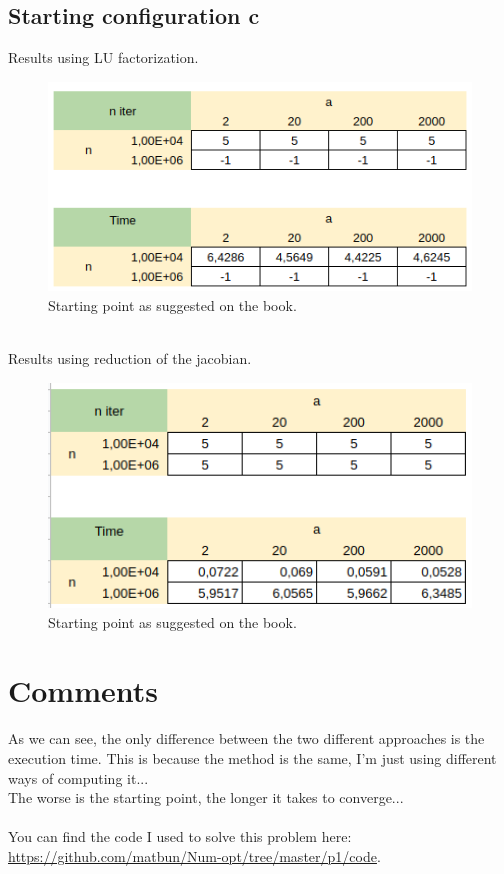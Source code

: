 \documentclass[]{article}
\begin{document}
\subsection{Starting configuration c}
Results using LU factorization.\\
\begin{figure}[h]
	\includegraphics[width=12cm]{table4.png}
	\caption{Starting point as suggested on the book.}
\end{figure}\\
Results using reduction of the jacobian.
\begin{figure}[h]
	\includegraphics[width=12cm]{table1.png}
	\caption{Starting point as suggested on the book.}
\end{figure}
\pagebreak
\section{Comments}
As we can see, the only difference between the two different approaches is the execution time. This is because the method is the same, I'm just using different ways of computing it...\\
The worse is the starting point, the longer it takes to converge...\\\\
You can find the code I used to solve this problem here: \url{https://github.com/matbun/Num-opt/tree/master/p1/code}.
\end{document}

